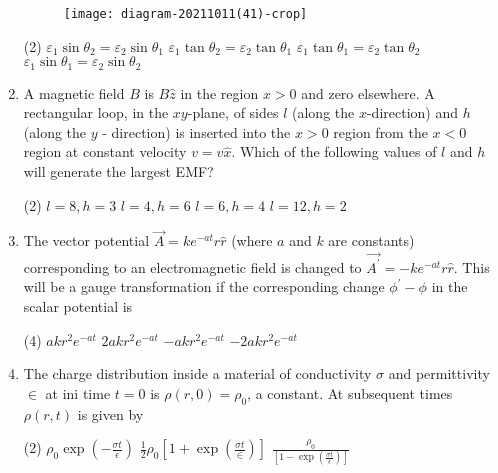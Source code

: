\begin{enumerate}
	{{}}
	\begin{figure}[H]
		\centering
		\texttt{[image: diagram-20211011(41)-crop]}
	\end{figure}
	\begin{tasks}(2)
		\task[\textbf{A.}] $\varepsilon_{1} \sin \theta_{2}=\varepsilon_{2} \sin \theta_{1}$
		\task[\textbf{B.}] $\varepsilon_{1} \tan \theta_{2}=\varepsilon_{2} \tan \theta_{1}$
		\task[\textbf{C.}] $\varepsilon_{1} \tan \theta_{1}=\varepsilon_{2} \tan \theta_{2}$
		\task[\textbf{D.}] $\varepsilon_{1} \sin \theta_{1}=\varepsilon_{2} \sin \theta_{2}$
	\end{tasks}
	\item A magnetic field $B$ is $B \hat{z}$ in the region $x>0$ and zero elsewhere. A rectangular loop, in the $x y$-plane, of sides $l$ (along the $x$-direction) and $h$ (along the $y$ - direction) is inserted into the $x>0$ region from the $x<0$ region at constant velocity $v=v \hat{x}$. Which of the following values of $l$ and $h$ will generate the largest EMF?
	{}
	\begin{tasks}(2)
		\task[\textbf{A.}] $l=8, h=3$
		\task[\textbf{B.}] $l=4, h=6$
		\task[\textbf{C.}] $l=6, h=4$
		\task[\textbf{D.}] $l=12, h=2$
	\end{tasks}
	\item The vector potential $\vec{A}=k e^{-a t} r \hat{r}$ (where $a$ and $k$ are constants) corresponding to an electromagnetic field is changed to $\overrightarrow{A^{\prime}}=-k e^{-a t} r \hat{r}$. This will be a gauge transformation if the corresponding change $\phi^{\prime}-\phi$ in the scalar potential is
	{}
	\begin{tasks}(4)
		\task[\textbf{A.}] $a k r^{2} e^{-a t}$
		\task[\textbf{B.}] $2 a k r^{2} e^{-a t}$
		\task[\textbf{C.}] $-a k r^{2} e^{-a t}$
		\task[\textbf{D.}] $-2 a k r^{2} e^{-a t}$
	\end{tasks}
	\item The charge distribution inside a material of conductivity $\sigma$ and permittivity $\in$ at ini time $t=0$ is $\rho(r, 0)=\rho_{0}$, a constant. At subsequent times $\rho(r, t)$ is given by
	{}
	\begin{tasks}(2)
		\task[\textbf{A.}]  $\rho_{0} \exp \left(-\frac{\sigma t}{\epsilon}\right)$
		\task[\textbf{B.}] $\frac{1}{2} \rho_{0}\left[1+\exp \left(\frac{\sigma t}{\in}\right)\right]$
		\task[\textbf{C.}]  $\frac{\rho_{0}}{\left[1-\exp \left(\frac{\sigma t}{\epsilon}\right)\right]}$

\end{tasks}
\end{enumerate}
